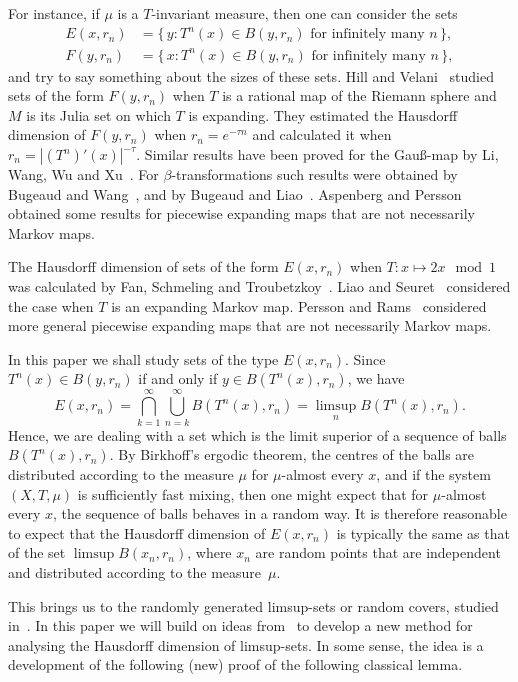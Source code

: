 \documentclass[10pt]{amsart}
\theoremstyle{definition}\newtheorem{defi}[theo]{Definition}\newtheorem{rema}[theo]{Remark}\newtheorem{exam}[theo]{Example}\newtheorem{exem}[theo]{Example}\newtheorem{nota}[theo]{Notation}
\begin{document}
For instance, if $\mu$ is a $T$-invariant measure, then one can consider the sets
\begin{align*}
E (x,r_n) &= \{\, y : T^n (x) \in B(y,r_n) \text{ for infinitely many } n \,\},\\ F (y,r_n) &= \{\, x : T^n (x) \in B(y,r_n) \text{ for infinitely many } n \,\},
\end{align*}
and try to say something about the sizes of these sets. Hill and Velani~\cite{hillvelani} studied sets of the form $F(y, r_n)$ when $T$ is a rational map of the Riemann sphere and $M$ is its Julia set on which $T$ is expanding. They estimated the Hausdorff dimension of $F(y,r_n)$ when $r_n = e^{-\tau n}$ and calculated it when $r_n = |(T^n)' (x)|^{-\tau}$. Similar results have been proved for the Gau\ss-map by Li, Wang, Wu and Xu~\cite{liwangwuxu}. For $\beta$-transformations such results were obtained by Bugeaud and Wang~\cite{bugeaudwang}, and by Bugeaud and Liao~\cite{bugeaudliao}. Aspenberg and Persson~\cite{aspenbergpersson} obtained some results for piecewise expanding maps that are not necessarily Markov maps.

The Hausdorff dimension of sets of the form $E(x,r_n)$ when $T \colon x \mapsto 2x \mod 1$ was calculated by Fan, Schmeling and Troubetzkoy~\cite{fanschmelingtroubetzkoy}. Liao and Seuret~\cite{liaoseuret} considered the case when $T$ is an expanding Markov map. Persson and Rams~\cite{perssonrams} considered more general piecewise expanding maps that are not necessarily Markov maps.

In this paper we shall study sets of the type $E (x,r_n)$. Since $T^n (x) \in B(y,r_n)$ if and only if $y \in B(T^n(x),r_n)$, we have
\[
E(x,r_n) = \bigcap_{k=1}^\infty \bigcup_{n=k}^\infty B(T^n(x),r_n) =
\limsup_n B(T^n(x),r_n).
\]
Hence, we are dealing with a set which is the limit superior of a sequence of balls $B(T^n(x),r_n)$. By Birkhoff's ergodic theorem, the centres of the balls are distributed according to the measure $\mu$ for $\mu$-almost every $x$, and if the system $(X,T,\mu)$ is sufficiently fast mixing, then one might expect that for $\mu$-almost every $x$, the sequence of balls behaves in a random way. It is therefore reasonable to expect that the Hausdorff dimension of $E(x,r_n)$ is typically the same as that of the set $\limsup B(x_n,r_n)$, where $x_n$ are random points that are independent and distributed according to the measure~$\mu$.

This brings us to the randomly generated limsup-sets or random covers, studied in~\cite{fanwu,durand,jarvenpaaetal,persson,fengetal,seuret,ekstrompersson}. In this paper we will build on ideas from~\cite{persson} to develop a new method for analysing the Hausdorff dimension of limsup-sets. In some sense, the idea is a development of the following (new) proof of the following classical lemma.
\end{document}

